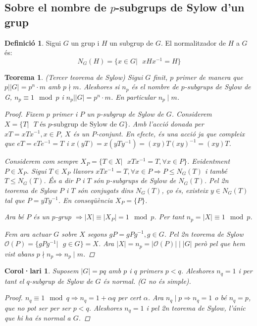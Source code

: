 \documentclass[a4paper,11pt]{report}
\newcommand{\inv}[1]{#1^{-1}}
\newcommand{\orb}{\mathcal{O}}
\renewcommand{\div}{\mid}
\newcommand{\ordre}[1]{|#1|}
\theoremstyle{theorem}
\newtheorem{teorema}{\normalfont \sffamily\bfseries Teorema}[section]
\newtheorem{col}{\normalfont \sffamily\bfseries Corol·lari}[section]
\theoremstyle{definition}
\newtheorem{definicio}{\normalfont\sffamily\bfseries Definició}[section]
\begin{document}
\subsection{Sobre el nombre de $p$-subgrups de Sylow d'un grup}
\begin{definicio}
	Sigui $G$ un grup i $H$ un subgrup de $G$. El normalitzador de $H$ a $G$ és:
	$$N_G(H)=\{x\in G|\text{ }xH\inv{x}=H\}$$
\end{definicio}
\begin{teorema}{(Tercer teorema de Sylow)}
	Sigui $G$ finit, $p$ primer de manera que $p\big||G|=p^n\cdot m$ amb $p\nmid m$. Aleshores si $n_p$ és el nombre de $p$-subgrups de Sylow de G, $n_p\equiv 1\mod p$ i $n_p\big||G|=p^n\cdot m$. En particular $n_p\div m$.
	\begin{proof}
		Fixem $p$ primer i $P$ un $p$-subgrup de Sylow de $G$. Considerem $X=\{T|\text{ }T\text{ és $p$-subgrup de Sylow de $G$}\}$. Amb l'acció donada per $xT=xT\inv{x},x\in P$, $X$ és un $P$-conjunt. En efecte, és una acció ja que compleix que $eT=eT\inv{e}=T$ i $x(yT)=x(yT\inv{y})=(xy)T\inv{(xy)}=(xy)T$. 
		
		Considerem com sempre $X_P=\{ T\in X | \text{ } xT\inv{x}=T ,\forall x\in P\}$. Evidentment $P\in X_P$. Sigui $T\in X_P$ llavors $xT\inv{x}=T,\forall x\in P\Rightarrow P\leq N_G(T)$ i també $T\leq N_G(T)$. És a dir $P$ i $T$ són $p$-subgrups de Sylow de $N_G(T)$. Pel 2n teorema de Sylow $P$ i $T$ són conjugats dins $N_G(T)$, ço és, existeix $y\in N_G(T)$ tal que $P=yT\inv{y}$. En conseqüència $X_P=\{P\}$.
		
		Ara bé $P$ és un $p$-grup $\Rightarrow\ordre{X}\equiv\ordre{X_P}=1\mod p$. Per tant $n_p=\ordre{X}\equiv 1\mod p$.
		
		Fem ara actuar $G$ sobre $X$ segons $gP=gP\inv{g},g\in G$. Pel 2n teorema de Sylow $\orb(P)=\{gP\inv{g}|\text{ }g\in G\}=X$. Ara $\ordre{X}=n_p=\ordre{\orb(P)}\div \ordre{G}$ però pel que hem vist abans $p\nmid n_p\Rightarrow n_p\div m$.
	\end{proof}
\end{teorema}
\begin{col}
	Suposem  $\ordre{G}=pq$ amb $p$ i $q$ primers $p<q$. Aleshores $n_q=1$ i per tant el $q$-subgrup de Sylow de $G$ és normal. ($G$ no és simple).
	\begin{proof}
	$n_q\equiv 1\mod q\Rightarrow n_q=1+\alpha q$ per cert $\alpha$. Ara $n_q\div p\Rightarrow n_q=1$ o bé $n_q=p$, que no pot ser per ser $p<q$. Aleshores $n_q=1$ i pel 2n teorema de Sylow, l'únic que hi ha és normal a $G$.
	\end{proof}
\end{col}
\end{document}
